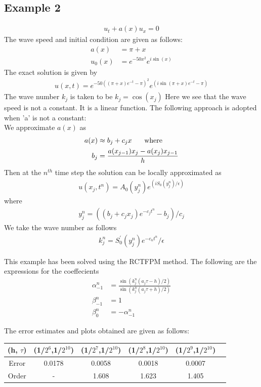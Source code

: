 \subsection{Example 2}
\begin{align}
 u_{t} + a(x)u_{x} = 0
\end{align}
The wave speed and initial condition are given as follows:
\begin{align}
 a(x) &= \pi + x\\
 u_{0}(x) &= e^{-50x^2}e^{i\sin(x)}
\end{align}
The exact solution is given by
\begin{align}
 u(x,t) = e^{-50((\pi+x)e^{-t}-\pi)^2}e^{(i\sin(\pi+x)e^{-t}-\pi)}
\end{align}
The wave number $k_{j}$ is taken to be $k_{j}=\cos(x_{j})$
Here we see that the wave speed is not a constant.
It is a linear function. The following approach is adopted when 'a' is not a constant:\\
We approximate $a(x)$ as
\begin{align}
 a(x) &\approx b_{j} + c_{j}x\hspace{5mm} \text{ where }\\
 b_{j} &= \frac{a(x_{j-1})x_{j}-a(x_{j})x_{j-1}}{h}
\end{align}
Then at the $n^{th}$ time step the solution can be locally approximated as
\begin{align}
 u(x_{j},t^{n}) = A_{0}(y_{j}^{n})e^{(iS_{0}(y_{j}^{n})/\epsilon)}
\end{align}
where
\begin{align}
 y_{j}^{n} = ((b_{j}+c_{j}x_{j})e^{-c_{j}t^{n}} -b_{j})/c_{j} 
\end{align}
We take the wave number as follows
\begin{align}
 k_{j}^{n} = S_{0}^{'}(y_{j}^{n})e^{-c_{n}t^{n}}/\epsilon
\end{align}

This example has been solved using the RCTFPM method. The following are the expressions for the coeffecients
\begin{align}
 \alpha_{-1}^{n} &= \frac{\sin(k_{j}^{n}(a_{j}\tau - h)/2)}{\sin(k_{j}^{n}(a_{j}\tau + h)/2)}\\
 \beta_{-1}^{n} &= 1\\
 \beta_{0}^{n} &= -\alpha_{-1}^{n}
\end{align}

The error estimates and plots obtained are given as follows:

\begin{tabular}{|c|c|c|c|c|c|}
   \hline
   (h, $\tau$)  & (1/$2^{6}$,1/$2^{10}$)  & (1/$2^{7}$,1/$2^{10}$) & (1/$2^{8}$,1/$2^{10}$) &  (1/$2^{9}$,1/$2^{10}$)\\
  \hline
  Error  & 0.0178  & 0.0058 & 0.0018 &  0.0007\\
  \hline
  Order & -  &  1.608  & 1.623 & 1.405\\
\hline
\end{tabular}


